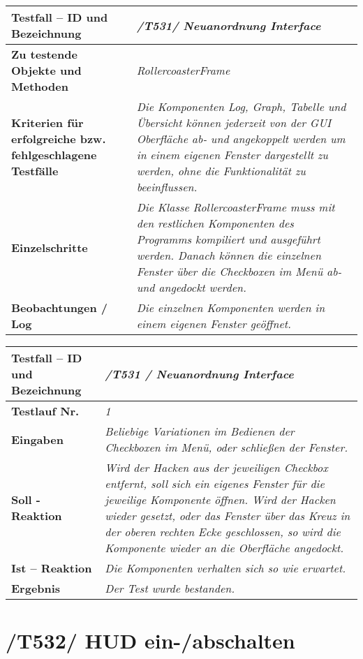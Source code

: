 \begin{longtable}{|p{7cm}|p{10cm}|}
\hline
\textbf{Testfall -- ID und Bezeichnung} &  \textit{/T531/ Neuanordnung Interface} \\
\hline
\textbf{Zu testende Objekte und Methoden} &  \textit{RollercoasterFrame}
\\
\hline
\textbf{Kriterien für erfolgreiche bzw. fehlgeschlagene Testfälle} &
\textit{Die Komponenten Log, Graph, Tabelle und Übersicht können jederzeit von der GUI Oberfläche ab- und angekoppelt werden um in einem eigenen Fenster dargestellt zu werden, ohne die Funktionalität zu beeinflussen.} \\
\hline
\textbf{Einzelschritte} &  \textit{Die Klasse RollercoasterFrame muss mit den restlichen Komponenten des Programms kompiliert und ausgeführt werden. Danach können die einzelnen Fenster über
die Checkboxen im Menü ab- und angedockt werden.} \\
\hline
\textbf{Beobachtungen / Log} &  \textit{Die einzelnen Komponenten werden in einem eigenen Fenster geöffnet.} \\
\hline
\end{longtable}

\begin{longtable}{|p{7cm}|p{10cm}|}
\hline
\textbf{Testfall -- ID und Bezeichnung} & \textit{ /T531 / Neuanordnung Interface} \\
\hline
\textbf{Testlauf Nr.} & \textit{1} \\
\hline
\textbf{Eingaben} & \textit{Beliebige Variationen im Bedienen der Checkboxen im Menü, oder schließen der Fenster.} \\
\hline
\textbf{Soll - Reaktion} & \textit{Wird der Hacken aus der jeweiligen Checkbox entfernt, soll sich ein eigenes Fenster für die jeweilige Komponente öffnen. Wird der Hacken wieder gesetzt, 
oder das Fenster über das Kreuz in der oberen rechten Ecke geschlossen, so wird die Komponente wieder an die Oberfläche angedockt.} \\
\hline
\textbf{Ist -- Reaktion} & \textit{Die Komponenten verhalten sich so wie erwartet.} \\
\hline
\textbf{Ergebnis} & \textit{Der Test wurde bestanden.} \\
\hline
\end{longtable}

\section{/T532/ HUD ein-/abschalten}


